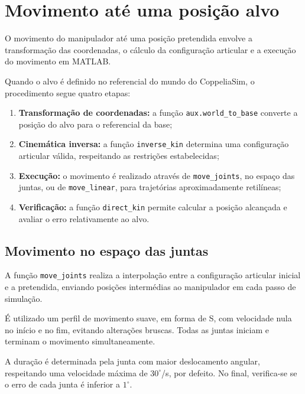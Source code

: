 
\section{Movimento até uma posição alvo}
\label{sec:imp_move}

O movimento do manipulador até uma posição pretendida envolve a transformação das coordenadas, o cálculo da configuração articular e a execução do movimento em MATLAB.

Quando o alvo é definido no referencial do mundo do CoppeliaSim, o procedimento segue quatro etapas:

\begin{enumerate}
    \item \textbf{Transformação de coordenadas:} a função \texttt{aux.world\_to\_base} converte a posição do alvo para o referencial da base;

    \item \textbf{Cinemática inversa:} a função \texttt{inverse\_kin} determina uma configuração articular válida, respeitando as restrições estabelecidas;

    \item \textbf{Execução:} o movimento é realizado através de \texttt{move\_joints}, no espaço das juntas, ou de \texttt{move\_linear}, para trajetórias aproximadamente retilíneas;

    \item \textbf{Verificação:} a função \texttt{direct\_kin} permite calcular a posição alcançada e avaliar o erro relativamente ao alvo.
\end{enumerate}

\subsection{Movimento no espaço das juntas}

A função \texttt{move\_joints} realiza a interpolação entre a configuração articular inicial e a pretendida, enviando posições intermédias ao manipulador em cada passo de simulação.

É utilizado um perfil de movimento suave, em forma de S, com velocidade nula no início e no fim, evitando alterações bruscas. Todas as juntas iniciam e terminam o movimento simultaneamente.

A duração é determinada pela junta com maior deslocamento angular, respeitando uma velocidade máxima de $30^\circ$/s, por defeito. No final, verifica-se se o erro de cada junta é inferior a $1^\circ$.

